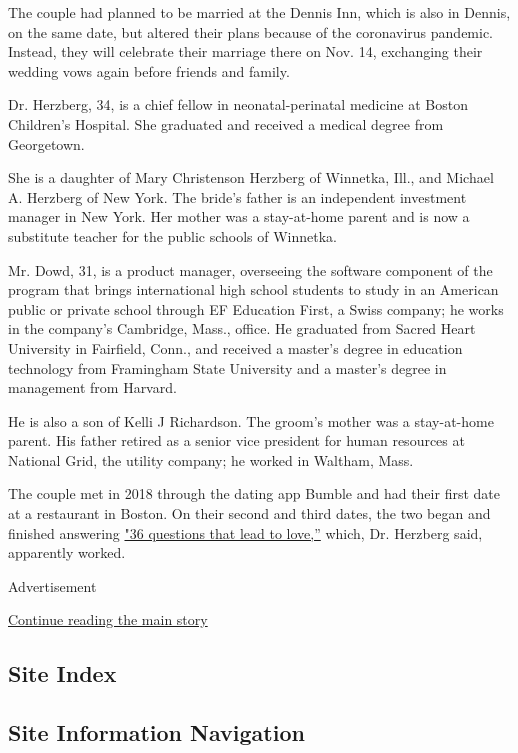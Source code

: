 The couple had planned to be married at the Dennis Inn, which is also in
Dennis, on the same date, but altered their plans because of the
coronavirus pandemic. Instead, they will celebrate their marriage there
on Nov. 14, exchanging their wedding vows again before friends and
family.

Dr. Herzberg, 34, is a chief fellow in neonatal-perinatal medicine at
Boston Children's Hospital. She graduated and received a medical degree
from Georgetown.

She is a daughter of Mary Christenson Herzberg of Winnetka, Ill., and
Michael A. Herzberg of New York. The bride's father is an independent
investment manager in New York. Her mother was a stay-at-home parent and
is now a substitute teacher for the public schools of Winnetka.

Mr. Dowd, 31, is a product manager, overseeing the software component of
the program that brings international high school students to study in
an American public or private school through EF Education First, a Swiss
company; he works in the company's Cambridge, Mass., office. He
graduated from Sacred Heart University in Fairfield, Conn., and received
a master's degree in education technology from Framingham State
University and a master's degree in management from Harvard.

He is also a son of Kelli J Richardson. The groom's mother was a
stay-at-home parent. His father retired as a senior vice president for
human resources at National Grid, the utility company; he worked in
Waltham, Mass.

The couple met in 2018 through the dating app Bumble and had their first
date at a restaurant in Boston. On their second and third dates, the two
began and finished answering
\href{https://www.nytimes3xbfgragh.onion/2015/01/11/style/36-questions-that-lead-to-love.html}{"36
questions that lead to love,''} which, Dr. Herzberg said, apparently
worked.

Advertisement

\protect\hyperlink{after-bottom}{Continue reading the main story}

\hypertarget{site-index}{%
\subsection{Site Index}\label{site-index}}

\hypertarget{site-information-navigation}{%
\subsection{Site Information
Navigation}\label{site-information-navigation}}

